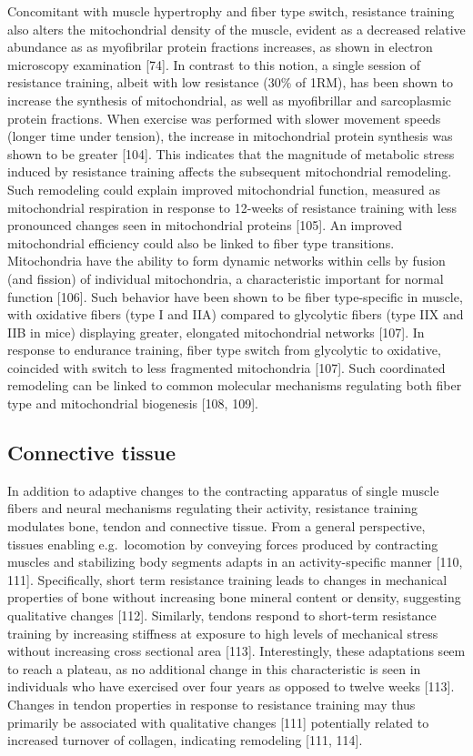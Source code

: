 \documentclass[twoside,10pt]{gihclass} %
\begin{document}
Concomitant with muscle hypertrophy and fiber type switch, resistance training also alters the mitochondrial density of the muscle, evident as a decreased relative abundance as as myofibrilar protein fractions increases, as shown in electron microscopy examination
{[}74{]}.
In contrast to this notion, a single session of resistance training, albeit with low resistance (30\% of 1RM), has been shown to increase the synthesis of mitochondrial, as well as myofibrillar and sarcoplasmic protein fractions. When exercise was performed with slower movement speeds (longer time under tension), the increase in mitochondrial protein synthesis was shown to be greater
{[}104{]}.
This indicates that the magnitude of metabolic stress induced by resistance training affects the subsequent mitochondrial remodeling.
Such remodeling could explain improved mitochondrial function, measured as mitochondrial respiration in response to 12-weeks of resistance training with less pronounced changes seen in mitochondrial proteins
{[}105{]}.
An improved mitochondrial efficiency could also be linked to fiber type transitions.
Mitochondria have the ability to form dynamic networks within cells by fusion (and fission) of individual mitochondria, a characteristic important for normal function
{[}106{]}.
Such behavior have been shown to be fiber type-specific in muscle, with oxidative fibers (type I and IIA) compared to glycolytic fibers (type IIX and IIB in mice) displaying greater, elongated mitochondrial networks
{[}107{]}.
In response to endurance training, fiber type switch from glycolytic to oxidative, coincided with switch to less fragmented mitochondria
{[}107{]}.
Such coordinated remodeling can be linked to common molecular mechanisms regulating both fiber type and mitochondrial biogenesis
{[}108, 109{]}.

\hypertarget{connective-tissue}{%
\subsection{Connective tissue}\label{connective-tissue}}

In addition to adaptive changes to the contracting apparatus of single muscle fibers and neural mechanisms regulating their activity, resistance training modulates bone, tendon and connective tissue.
From a general perspective, tissues enabling e.g.~locomotion by conveying forces produced by contracting muscles and stabilizing body segments adapts in an activity-specific manner
{[}110, 111{]}.
Specifically, short term resistance training leads to changes in mechanical properties of bone without increasing bone mineral content or density, suggesting qualitative changes
{[}112{]}.
Similarly, tendons respond to short-term resistance training by increasing stiffness at exposure to high levels of mechanical stress without increasing cross sectional area
{[}113{]}.
Interestingly, these adaptations seem to reach a plateau, as no additional change in this characteristic is seen in individuals who have exercised over four years as opposed to twelve weeks
{[}113{]}.
Changes in tendon properties in response to resistance training may thus primarily be associated with qualitative changes
{[}111{]}
potentially related to increased turnover of collagen, indicating remodeling
{[}111, 114{]}.
\end{document}
